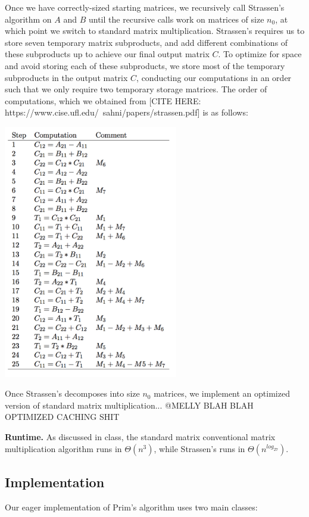 \documentclass[a4paper]{article}
\begin{document}
Once we have correctly-sized starting matrices, we recursively call Strassen's algorithm on $A$ and $B$ until the recursive calls work on matrices of size $n_0$, at which point we switch to standard matrix multiplication. Strassen's requires us to store seven temporary matrix subproducts, and add different combinations of these subproducts up to achieve our final output matrix $C$. To optimize for space and avoid storing each of these subproducts, we store most of the temporary subproducts in the output matrix $C$, conducting our computations in an order such that we only require two temporary storage matrices. The order of computations, which we obtained from [CITE HERE: https://www.cise.ufl.edu/~sahni/papers/strassen.pdf] is as follows:
\begin{center}
\includegraphics[width=3in]{computations.png}
\end{center}

Once Strassen's decomposes into size $n_0$ matrices, we implement an optimized version of standard matrix multiplication... @MELLY BLAH BLAH OPTIMIZED CACHING SHIT

\textbf{Runtime.} As discussed in class, the standard matrix conventional matrix multiplication algorithm runs in $\Theta(n^3)$, while Strassen's runs in $\Theta(n^{log_27})$.



\subsection{Implementation}
Our eager implementation of Prim's algorithm uses two main classes:
\end{document}
